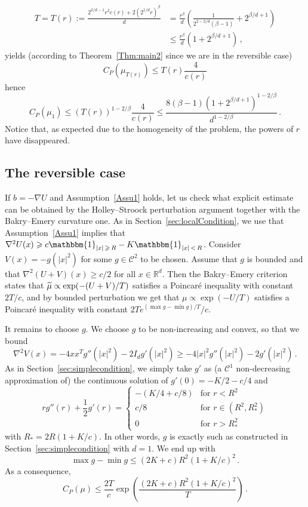 \documentclass[10pt]{amsart}
\theoremstyle{definition}\newtheorem{defi}[theo]{Definition}\newtheorem{rema}[theo]{Remark}\newtheorem{exam}[theo]{Example}\newtheorem{exem}[theo]{Example}\newtheorem{nota}[theo]{Notation}
\newcommand{\R}{\mathbb R}
\newcommand{\clC}{\mathcal C}
\newcommand{\na}{\nabla}
\newcommand{\1}{\mathbbm{1}}
\newcommand{\nv}[1]{#1}
\let\oldtilde\tilde
\renewcommand*{\tilde}[1]{\mathchoice{\widetilde{#1}}{\widetilde{#1}}{\oldtilde{#1}}{\oldtilde{#1}}}
\begin{document}
\begin{align*}
T = T(r) := \frac{ 2^{2/d-1} r^2 c(r)+2(2^{1/d}r)^\beta}{d} &= \frac{ r^{\beta} }{ d} \left( \frac{1}{2^{2-2/d} (\beta-1)} + 2^{\beta/d+1}\right)\\
&\leqslant \frac{r^\beta}{d}\left( 1+ 2^{\beta/d+1} \right) \,,
\end{align*}
yields (according to Theorem~\ref{Thm:main2} since we are in the reversible case)
\[
C_P(\mu_{T(r)}) \leqslant T(r)\frac{4}{c(r)}
\]
hence
\[
C_P(\mu_1) \leqslant \left( T(r)\right)^{1-2/\beta}\frac{4}{c(r)} \leqslant \frac{ 8 (\beta-1) \left( 1+ 2^{\beta/d+1} \right)^{1-2/\beta}}{d^{1-2/\beta}}\,.
\]
Notice that, as expected due to the homogeneity of the problem, the powers of $r$ have disappeared.


\subsection{The reversible case}\label{Sec:reversible}

If $b=-\na U$ and Assumption~\ref{Assu1} holds, let us check what explicit estimate can be obtained by the Holley--Stroock perturbation argument together with the Bakry--Emery curvature one. As in Section~\ref{sec:localCondition}, we use that Assumption~\ref{Assu1} implies that $\na^2 U(x) \geqslant c\1_{|x|\,\geqslant\,R}-K\1_{|x|\,<\,R}$. Consider $V(x)= - g(|x|^2)$ for some $g\in\clC^2$ to be chosen. Assume that $g$ is bounded and that $\na^2 (U+V)(x) \geqslant c/2$ for all $x\in\R^d$. Then the Bakry--Emery criterion states that $\tilde \mu \propto \exp(-(U+V)/T)$ satisfies a Poincaré inequality with constant $2T/c$, and by bounded perturbation we get that $\mu\propto \exp(-U/T)$ satisfies a Poincaré inequality with constant $2T e^{(\max g - \min g)/T}/c$.

It remains to choose $g$. We \nv{choose} $g$ to be non-increasing and convex, so that we bound
\[
\na^2 V(x) = - 4 x x^T g''(|x|^2) - 2 I_d g'(|x|^2) \geqslant -4|x|^2 g''(|x|^2) - 2 g'(|x|^2) \,.
\]
As in Section~\ref{sec:simplecondition}, we simply take $g'$ as (a $\clC^1$ non-decreasing approximation of) the continuous solution of $g'(0)=-K/2-c/4$ and
\[
r g''(r) + \frac{1}2 g'(r) = \left\{
\begin{array}{ll}
-(K/4+c/8) & \text{for }r<R^2\\
c/8 & \text{for }r\in(R^2,R_*^2)\\
0 & \text{for }r>R_*^2
\end{array}\right.
\]
with $R_* =2R(1+K/c)$. In other words, $g$ is exactly such as constructed in Section~\ref{sec:simplecondition} with $d=1$. We end up with
\[
\max g - \min g \leqslant (2K+c)R^2(1+K/c)^2\,.
\]
As a consequence,
\[
C_P(\mu) \leqslant \frac{2T}{c}\exp\left( \frac{(2K+c)R^2(1+K/c)^2}{T}\right) \,.
\]
\end{document}
